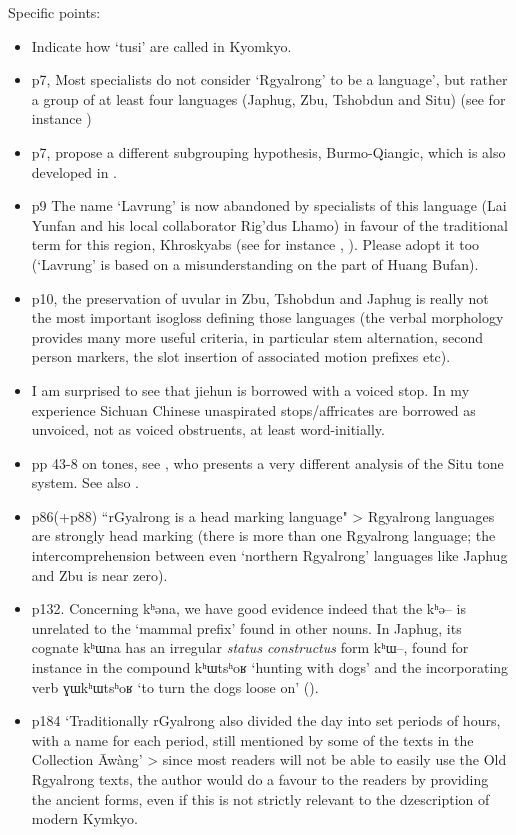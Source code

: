 \documentclass[oldfontcommands,oneside,a4paper,11pt]{article}
\newcommand{\ipa}[1]{{\phon \mbox{#1}}} %
\begin{document}
Specific points:
\begin{itemize}
\item Indicate how `tusi' are called in Kyomkyo.
\item p7, Most specialists do not consider `Rgyalrong' to be a  language', but rather a group of at least four languages (Japhug, Zbu, Tshobdun and Situ) (see for instance \citealt[195]{jacques13harmonization})
\item p7, \citet{jacques.michaud11naish} propose a different subgrouping hypothesis, Burmo-Qiangic, which is also developed in \citet{jacques14esquisse}.
\item p9 The name `Lavrung' is now abandoned by specialists of this language (Lai Yunfan and his local collaborator Rig'dus Lhamo) in favour of the traditional term for this region, Khroskyabs (see for instance \citealt{delancey14second}, \citealt{jacques14inverse}). Please adopt it too (`Lavrung' is based on a misunderstanding on the part of Huang Bufan).
\item p10, the preservation of uvular in Zbu, Tshobdun and Japhug is really not the most important isogloss defining those languages (the verbal morphology provides many more useful criteria, in particular stem alternation, second person markers, the slot insertion of associated motion prefixes etc).
\item I am surprised to see that jiehun is borrowed with a voiced stop. In my experience Sichuan Chinese unaspirated stops/affricates are borrowed as unvoiced, not as voiced obstruents, at least word-initially.
\item pp 43-8 on tones, see \citet{linyj12tone}, who presents a very different analysis of the Situ tone system. See also \citet{jackson05yingao.zh}.
\item p86(+p88) ``rGyalrong is a head marking language" > Rgyalrong languages are strongly head marking (there is more than one Rgyalrong language; the intercomprehension between even `northern Rgyalrong' languages like Japhug and Zbu is near zero).
\item p132.  Concerning \ipa{kʰəna}, we have good evidence indeed that the \ipa{kʰə--} is unrelated to the `mammal prefix' found in other nouns. In Japhug, its cognate \ipa{kʰɯna} has an irregular \textit{status constructus} form \ipa{kʰɯ--}, found for instance in the compound \ipa{kʰɯtsʰoʁ} `hunting with dogs'  and the incorporating verb \ipa{ɣɯkʰɯtsʰoʁ} `to turn the dogs loose on' (\citealt[1214, 1223]{jacques12incorp}).
\item p184 `Traditionally rGyalrong also divided the day into set periods of hours, with a name for each period, still mentioned by some of the texts in the Collection Āwàng' > since most readers will not be able to easily use the Old Rgyalrong texts, the author would do a favour to the readers by providing the ancient forms, even if this is not strictly relevant to the dzescription of modern Kymkyo.

\end{itemize}
\end{document}
